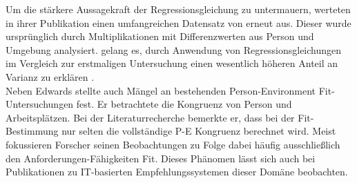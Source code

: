 Um die stärkere Aussagekraft der Regressionsgleichung zu untermauern, werteten \textcite[S. 18ff.]{edwards:1993b}  in ihrer Publikation einen umfangreichen Datensatz von \textcite{mechanismsOfJobStressAndStrain:1982} erneut aus. Dieser wurde ursprünglich durch Multiplikationen mit Differenzwerten aus Person und Umgebung analysiert. \textcite[S. 18ff.]{edwards:1993b} gelang es, durch Anwendung von Regressionsgleichungen im Vergleich zur erstmaligen Untersuchung einen wesentlich höheren Anteil an Varianz zu erklären \cite[S. 8]{su:2015}.\\
Neben Edwards stellte auch \textcite[S. 3]{schneider:2001}\cite[S. 2]{schneider:1978} Mängel an bestehenden Person-Environment Fit-Untersuchungen fest. Er betrachtete die Kongruenz von Person und Arbeitsplätzen. Bei der Literaturrecherche bemerkte er, dass bei der Fit-Bestimmung nur selten die vollständige P-E Kongruenz berechnet wird. Meist fokussieren Forscher seinen Beobachtungen zu Folge dabei häufig ausschließlich den Anforderungen-Fähigkeiten Fit. Dieses Phänomen lässt sich auch bei Publikationen zu IT-basierten Empfehlungssystemen dieser Domäne beobachten.
